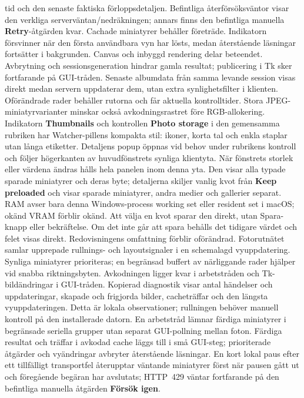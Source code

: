 \documentclass[11pt,a4paper]{article}
\newcommand{\ui}[1]{\textbf{#1}}
\begin{document}
tid och den senaste faktiska förloppsdetaljen. Befintliga återförsöksväntor visar
den verkliga serverväntan/nedräkningen; annars finns den befintliga manuella
\ui{Retry}-åtgärden kvar. Cachade miniatyrer behåller företräde. Indikatorn
försvinner när den första användbara vyn har lösts, medan återstående läsningar
fortsätter i bakgrunden. Canvas och inbyggd rendering delar beteendet.
Avbrytning och sessionsgeneration hindrar gamla resultat; publicering i Tk sker
fortfarande på GUI-tråden.
Senaste albumdata från samma levande session visas direkt medan servern
uppdaterar dem, utan extra synlighetsfilter i klienten. Oförändrade rader
behåller rutorna och får aktuella kontrolltider. Stora JPEG-miniatyrvarianter
minskar också avkodningsrastret före RGB-allokering.
Indikatorn \ui{Thumbnails} och kontrollen \ui{Photo storage} i den gemensamma
rubriken har Watcher-pillens kompakta stil: ikoner, korta tal och enkla staplar
utan långa etiketter. Detaljens popup öppnas vid behov under rubrikens kontroll
och följer högerkanten av huvudfönstrets synliga klientyta. När fönstrets storlek
eller värdena ändras hålls hela panelen inom denna yta.
Den visar alla typade sparade miniatyrer och deras byte; detaljerna skiljer
vanlig kvot från \ui{Keep preloaded} och visar sparade miniatyrer, andra medier
och gallerier separat. RAM avser bara denna Windows-process working set eller
resident set i macOS; okänd VRAM förblir okänd. Att välja en kvot sparar den
direkt, utan Spara-knapp eller bekräftelse. Om det inte går att spara behålls
det tidigare värdet och felet visas direkt. Redovisningens omfattning förblir
oförändrad.
Fotorutnätet samlar upprepade rullnings- och layoutsignaler i en schemalagd
vyuppdatering. Synliga miniatyrer prioriteras; en begränsad buffert av närliggande
rader hjälper vid snabba riktningsbyten. Avkodningen ligger kvar i arbetstråden
och Tk-bildändringar i GUI-tråden. Kopierad diagnostik visar antal händelser och
uppdateringar, skapade och frigjorda bilder, cacheträffar och den längsta
vyuppdateringen. Detta är lokala observationer; rullningen behöver manuell
kontroll på den installerade datorn.
En arbetstråd lämnar färdiga miniatyrer i begränsade seriella grupper utan
separat GUI-pollning mellan foton. Färdiga resultat och träffar i avkodad cache
läggs till i små GUI-steg; prioriterade åtgärder och vyändringar avbryter
återstående läsningar. En kort lokal paus efter ett tillfälligt transportfel
återupptar väntande miniatyrer först när pausen gått ut och föregående begäran
har avslutats; HTTP~429 väntar fortfarande på den befintliga manuella åtgärden
\ui{Försök igen}.
\end{document}
